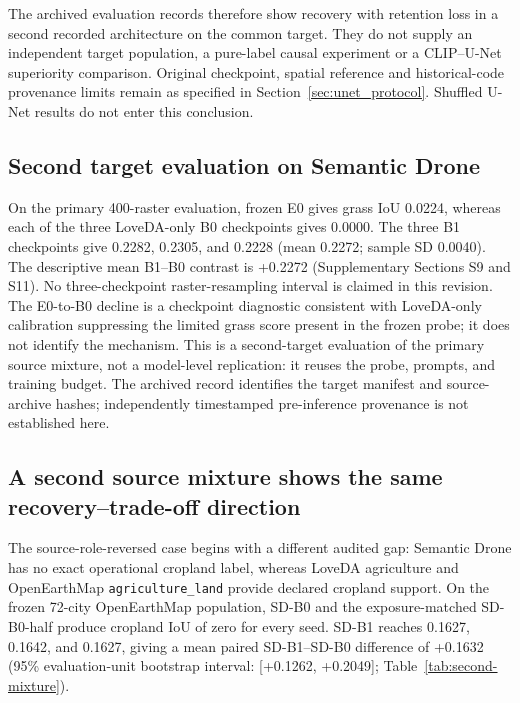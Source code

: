 The archived evaluation records therefore show recovery with retention loss in a second recorded architecture on the common target. They do not supply an independent target population, a pure-label causal experiment or a CLIP--U-Net superiority comparison. Original checkpoint, spatial reference and historical-code provenance limits remain as specified in Section~\ref{sec:unet_protocol}. Shuffled U-Net results do not enter this conclusion.



\subsection{Second target evaluation on Semantic Drone}
\label{sec:semanticdrone_result}

On the primary 400-raster evaluation, frozen E0 gives grass IoU 0.0224, whereas each of the three LoveDA-only B0 checkpoints gives 0.0000. The three B1 checkpoints give 0.2282, 0.2305, and 0.2228 (mean 0.2272; sample SD 0.0040). The descriptive mean B1--B0 contrast is +0.2272 (Supplementary Sections S9 and S11). No three-checkpoint raster-resampling interval is claimed in this revision. The E0-to-B0 decline is a checkpoint diagnostic consistent with LoveDA-only calibration suppressing the limited grass score present in the frozen probe; it does not identify the mechanism. This is a second-target evaluation of the primary source mixture, not a model-level replication: it reuses the probe, prompts, and training budget. The archived record identifies the target manifest and source-archive hashes; independently timestamped pre-inference provenance is not established here.





\subsection{A second source mixture shows the same recovery--trade-off direction}
\label{sec:second_mixture_result}

The source-role-reversed case begins with a different audited gap: Semantic Drone has no exact operational cropland label, whereas LoveDA agriculture and OpenEarthMap \texttt{agriculture\_land} provide declared cropland support. On the frozen 72-city OpenEarthMap population, SD-B0 and the exposure-matched SD-B0-half produce cropland IoU of zero for every seed. SD-B1 reaches 0.1627, 0.1642, and 0.1627, giving a mean paired SD-B1--SD-B0 difference of +0.1632 (95\% evaluation-unit bootstrap interval: [+0.1262, +0.2049]; Table~\ref{tab:second-mixture}).

